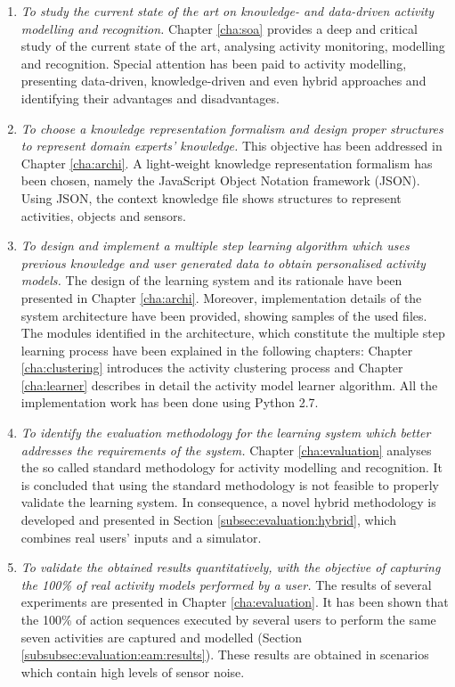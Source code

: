 \begin{enumerate}
 \item \textit{To study the current state of the art on knowledge- and data-driven activity modelling and recognition.} Chapter \ref{cha:soa} provides a deep and critical study of the current state of the art, analysing activity monitoring, modelling and recognition. Special attention has been paid to activity modelling, presenting data-driven, knowledge-driven and even hybrid approaches and identifying their advantages and disadvantages.
 \item \textit{To choose a knowledge representation formalism and design proper structures to represent domain experts' knowledge.} This objective has been addressed in Chapter \ref{cha:archi}. A light-weight knowledge representation formalism has been chosen, namely the JavaScript Object Notation framework (JSON). Using JSON, the context knowledge file shows structures to represent activities, objects and sensors.
 \item \textit{To design and implement a multiple step learning algorithm which uses previous knowledge and user generated data to obtain personalised activity models.} The design of the learning system and its rationale have been presented in Chapter \ref{cha:archi}. Moreover, implementation details of the system architecture have been provided, showing samples of the used files. The modules identified in the architecture, which constitute the multiple step learning process have been explained in the following chapters: Chapter \ref{cha:clustering} introduces the activity clustering process and Chapter \ref{cha:learner} describes in detail the activity model learner algorithm. All the implementation work has been done using Python 2.7.
 \item \textit{To identify the evaluation methodology for the learning system which better addresses the requirements of the system.} Chapter \ref{cha:evaluation} analyses the so called standard methodology for activity modelling and recognition. It is concluded that using the standard methodology is not feasible to properly validate the learning system. In consequence, a novel hybrid methodology is developed and presented in Section \ref{subsec:evaluation:hybrid}, which combines real users' inputs and a simulator. 
 \item \textit{To validate the obtained results quantitatively, with the objective of capturing the 100\% of real activity models performed by a user.} The results of several experiments are presented in Chapter \ref{cha:evaluation}. It has been shown that the 100\% of action sequences executed by several users to perform the same seven activities are captured and modelled (Section \ref{subsubsec:evaluation:eam:results}). These results are obtained in scenarios which contain high levels of sensor noise. 
\end{enumerate}


